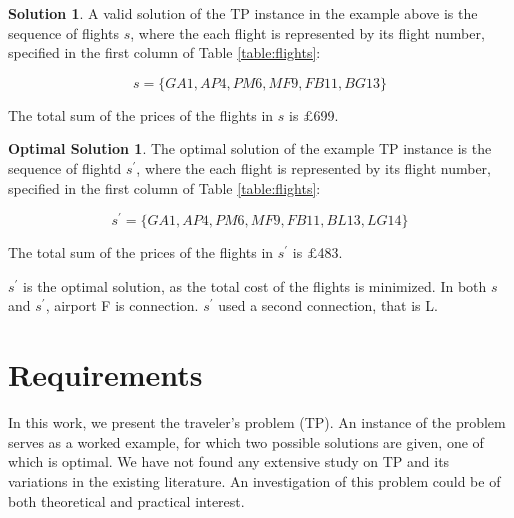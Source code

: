 \documentclass{article}
\theoremstyle{definition}
\newtheorem*{solution}{Solution}
\newtheorem*{osolution}{Optimal Solution}
\begin{document}
\begin{solution}
A valid solution of the TP instance in the example above is the sequence of flights $s$, where the each flight is represented by its flight number, specified in the first column of Table \ref{table:flights}:

$$ s = \{GA1, AP4, PM6, MF9, FB11, BG13\} $$

The total sum of the prices of the flights in $s$ is $\pounds$699.

\end{solution}

\begin{osolution}
The optimal solution of the example TP instance is the sequence of flightd $s^{\prime}$, where the each flight is represented by its flight number, specified in the first column of Table \ref{table:flights}:

$$ s^{\prime} = \{GA1, AP4, PM6, MF9, FB11, BL13, LG14\} $$

The total sum of the prices of the flights in $s^{\prime}$ is $\pounds$483.

$s^{\prime}$ is the optimal solution, as the total cost of the flights is minimized. In both $s$ and $s^{\prime}$, airport F is connection. $s^{\prime}$ used a second connection, that is L.
\end{osolution}

\section{Requirements}

In this work, we present the traveler's problem (TP). An instance of the problem serves as a worked example, for which two possible solutions are given, one of which is optimal. We have not found any extensive study on TP and its variations in the existing literature. An investigation of this problem could be of both theoretical and practical interest.
\end{document}
